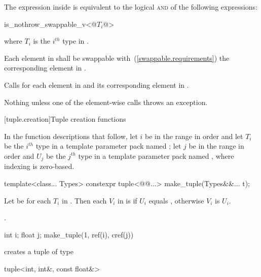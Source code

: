 \begin{itemdescr}
\pnum
\remark The expression inside  is equivalent to the logical
\textsc{and} of the following expressions:

\begin{codeblock}
is_nothrow_swappable_v<@$T_i$@>
\end{codeblock}

where $T_i$ is the $i^{th}$ type in .

\pnum
\requires
Each element in  shall be swappable with~(\ref{swappable.requirements})
the corresponding element in .

\pnum
\effects Calls  for each element in  and its
corresponding element in .

\pnum
\throws Nothing unless one of the element-wise  calls throws an exception.
\end{itemdescr}

[tuple.creation]{Tuple creation functions}

\pnum
In the function descriptions that follow, let $i$ be in the range 
in order and let $T_i$ be the $i^{th}$ type in a template parameter pack named ;
let $j$ be in the range  in order and $U_j$ be the $j^{th}$ type
in a template parameter pack named , where indexing is zero-based.

%
%
\begin{itemdecl}
template<class... Types>
  constexpr tuple<@@...> make_tuple(Types&&... t);
\end{itemdecl}

\begin{itemdescr} \pnum Let  be  for each
$T_i$ in . Then each $V_i$ in  is
 if $U_i$ equals , otherwise
$V_i$ is $U_i$.

\pnum
\returns {}.

\pnum
\enterexample

\begin{codeblock}
int i; float j;
make_tuple(1, ref(i), cref(j))
\end{codeblock}

creates a tuple of type

\begin{codeblock}
tuple<int, int&, const float&>
\end{codeblock}

\exitexample

\end{itemdescr}

